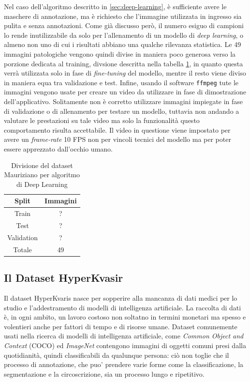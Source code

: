 Nel caso dell'algoritmo descritto in \ref{sec:deep-learning},
è sufficiente avere le maschere di annotazione, ma è richiesto
che l'immagine utilizzata in ingresso sia pulita e senza annotazioni.
Come già discusso però, il numero esiguo di campioni lo rende
inutilizzabile da solo per l'allenamento di un modello di
{\it deep learning}, o almeno non uno di cui i risultati abbiano
una qualche rilevanza statistica.
Le 49 immagini patologiche vengono quindi divise in maniera poco
generosa verso la porzione dedicata al training, divsione
descritta nella tabella \ref{tab:mauriziano-ii}, in quanto questa
verrà utilizzata solo in fase di {\it fine-tuning} del modello,
mentre il resto viene diviso in maniera equa tra validazione e test.
Infine, usando il software {\tt ffmpeg} tute le immagini vengono
usate per creare un video da utilizzare in fase di dimostrazione
dell'applicativo.
Solitamente non è corretto utilizzare immagini impiegate in fase
di validazione o di allenamento per testare un modello,
tuttavia non andando a valutare le prestazioni su tale video
ma solo la funzionalità questo comportamento risulta accettabile.
Il video in questione viene impostato per avere un {\it frame-rate}
10 FPS non per vincoli tecnici del modello ma per poter
essere apprezzato dall'occhio umano.

\begin{table}
    \center
    \begin{tabular}[h]{||c|c||}
        \hline
        Split & Immagini \\
        \hline
        Train & ? \\
        Test & ? \\
        Validation & ? \\
        \hline
        Totale & 49 \\
        \hline
    \end{tabular}
    \caption{\label{tab:mauriziano-ii}Divisione del dataset Mauriziano per
    algoritmo di Deep Learning}
\end{table}



\subsection{Il Dataset HyperKvasir}

Il dataset HyperKvaris\cite{HyperKvasirDataset} nasce per sopperire
alla mancanza di dati medici per lo studio e l'addestramento
di modelli di intelligenza artificiale.
La raccolta di dati è, in ogni ambito, un lavoro costoso non 
soltatno in termini monetari ma spesso e volentieri anche
per fattori di tempo e di risorse umane.
Dataset comunemente usati nella ricerca di modelli di intelligenza
artificiale, come {\it Common Object and Context}\cite{cocodataset}
(COCO) ed {\it ImageNet} \cite{imagenet} contengono
immagini di oggetti comuni presi dalla quotidianità,
quindi classificabili da qualunque persona: ciò non toglie
che il processo di annotazione, che puo' prendere
varie forme come la classificazione, la segmentazione e la
circoscrizione, sia un processo lungo e ripetitivo.

